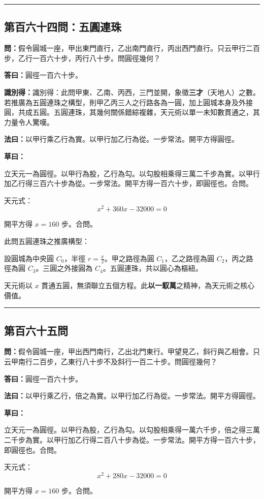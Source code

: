 \documentclass[11pt,a4paper]{article}
\newcommand{\longline}{\noindent\rule{\textwidth}{0.4pt}}
\newcommand{\wen}[1]{\par\noindent\textbf{\textcolor{probcolor}{問：}}{#1}\par}
\newcommand{\da}[1]{\par\noindent\textbf{\textcolor{anscolor}{答曰：}}{#1}\par}
\newcommand{\fayue}[1]{\par\noindent\textbf{\textcolor{methodcolor}{法曰：}}{#1}\par}
\newcommand{\caoyue}[1]{\par\noindent\textbf{草曰：}{#1}\par}
\newcommand{\zhi}[1]{\par\noindent\textbf{識別得：}{#1}\par}
\begin{document}
\vspace{0.5cm}
\longline

\subsection*{第百六十四問：五圓連珠}
\wen{假令圓城一座，甲出東門直行，乙出南門直行，丙出西門直行。只云甲行二百步，乙行一百六十步，丙行八十步。問圓徑幾何？}

\da{圓徑一百六十步。}

\zhi{識別得：此問甲東、乙南、丙西，三門並開，象徵\textbf{三才}（天地人）之數。若推廣為五圓連珠之構型，則甲乙丙三人之行路各為一圓，加上圓城本身及外接圓，共成五圓。五圓連珠，其幾何關係錯綜複雜，天元術以單一未知數貫通之，其力量令人驚嘆。}

\fayue{以甲行乘乙行為實。以甲行加乙行為從。一步常法。開平方得圓徑。}

\caoyue{
立天元一為圓徑。以甲行為股，乙行為勾。以勾股相乘得三萬二千步為實。以甲行加乙行得三百六十步為從。一步常法。開平方得一百六十步，即圓徑也。合問。

天元式：
$$x^2 + 360x - 32000 = 0$$

開平方得 $x = 160$ 步。合問。

此問五圓連珠之推廣構型：

設圓城為中央圓 $C_0$，半徑 $r = \frac{x}{2}$。甲之路徑為圓 $C_1$，乙之路徑為圓 $C_2$，丙之路徑為圓 $C_3$。三圓之外接圓為 $C_4$。五圓連珠，共以圓心為樞紐。

天元術以 $x$ 貫通五圓，無須聯立五個方程。此\textbf{以一馭萬}之精神，為天元術之核心價值。
}

\vspace{0.5cm}
\longline

\subsection*{第百六十五問}
\wen{假令圓城一座，甲出西門南行，乙出北門東行。甲望見乙，斜行與乙相會。只云甲南行二百步，乙東行八十步不及斜行一百二十步。問圓徑幾何？}

\da{圓徑一百六十步。}

\fayue{以甲行乘乙行，倍之為實。以甲行加乙行為從。一步常法。開平方得圓徑。}

\caoyue{
立天元一為圓徑。以甲行為股，乙行為勾。以勾股相乘得一萬六千步，倍之得三萬二千步為實。以甲行加乙行得二百八十步為從。一步常法。開平方得一百六十步，即圓徑也。合問。

天元式：
$$x^2 + 280x - 32000 = 0$$

開平方得 $x = 160$ 步。合問。
}
\end{document}
